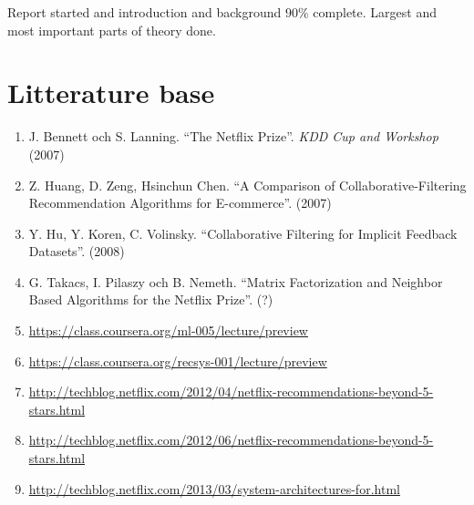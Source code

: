 \documentclass[11pt]{article}
\begin{document}
Report started and introduction and background $90\%$ complete. Largest and most important parts of theory done.

\newpage


\section*{Litterature base}

\begin{enumerate}

    \item J. Bennett och S. Lanning. ``The Netflix Prize''. \textit{KDD Cup and Workshop} (2007)

    \item Z. Huang, D. Zeng, Hsinchun Chen. ``A Comparison of Collaborative-Filtering Recommendation Algorithms for E-commerce''. (2007)

    \item Y. Hu, Y. Koren, C.  Volinsky. ``Collaborative Filtering for Implicit Feedback Datasets''. (2008)

    \item G. Takacs, I. Pilaszy och B. Nemeth. ``Matrix Factorization and Neighbor Based Algorithms for the Netflix Prize''. (?)

    \item \url{https://class.coursera.org/ml-005/lecture/preview}
    \item \url{https://class.coursera.org/recsys-001/lecture/preview}

    \item \url{http://techblog.netflix.com/2012/04/netflix-recommendations-beyond-5-stars.html}
    \item \url{http://techblog.netflix.com/2012/06/netflix-recommendations-beyond-5-stars.html}
    \item \url{http://techblog.netflix.com/2013/03/system-architectures-for.html}


\end{enumerate}

\newpage
\end{document}

